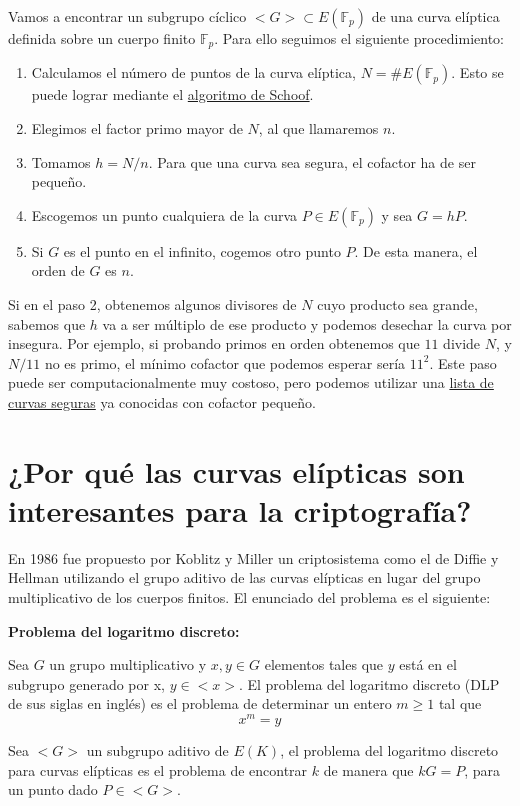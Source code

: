 \documentclass{article}
\begin{document}
Vamos a encontrar un subgrupo cíclico $<G>\subset E(\mathbb{F}_p)$ de
una curva elíptica definida sobre un cuerpo finito
$\mathbb{F}_p$. Para ello seguimos el siguiente procedimiento:

\begin{enumerate}
\item Calculamos el número de puntos de la curva elíptica, $N =
\#E(\mathbb{F}_p)$. Esto se puede lograr mediante el
\href{https://en.wikipedia.org/wiki/Schoof%27s_algorithm}{algoritmo de
Schoof}.
\item Elegimos el factor primo mayor de $N$, al que llamaremos $n$.
\item Tomamos $h = N/n$. Para que una curva sea segura, el cofactor ha
de ser pequeño.
\item Escogemos un punto cualquiera de la curva $P\in E(\mathbb{F}_p)$
y sea $G=hP$.
\item Si $G$ es el punto en el infinito, cogemos otro punto $P$. De
esta manera, el orden de $G$ es $n$.
\end{enumerate}

Si en el paso 2, obtenemos algunos divisores de $N$ cuyo producto sea
grande, sabemos que $h$ va a ser múltiplo de ese producto y podemos
desechar la curva por insegura. Por ejemplo, si probando primos en
orden obtenemos que $11$ divide $N$, y $N/11$ no es primo, el mínimo
cofactor que podemos esperar sería $11^2$.  Este paso puede ser
computacionalmente muy costoso, pero podemos utilizar una
\href{https://safecurves.cr.yp.to/}{lista de curvas seguras} ya
conocidas con cofactor pequeño.

\section{¿Por qué las curvas elípticas son interesantes para la
criptografía?}

En 1986 fue propuesto por Koblitz y Miller un criptosistema como el de
Diffie y Hellman utilizando el grupo aditivo de las curvas elípticas
en lugar del grupo multiplicativo de los cuerpos finitos. El enunciado
del problema es el siguiente:

\textbf{Problema del logaritmo discreto:}

Sea $G$ un grupo multiplicativo y $x,y \in G$ elementos tales que $y$
está en el subgrupo generado por x, $y \in <x>$. El problema del
logaritmo discreto (DLP de sus siglas en inglés) es el problema de
determinar un entero $m\geq 1$ tal que
$$x^m=y$$

Sea $<G>$ un subgrupo aditivo de $E(K)$, el problema del logaritmo
discreto para curvas elípticas es el problema de encontrar $k$ de
manera que $kG=P$, para un punto dado $P \in <G>$.
\end{document}
